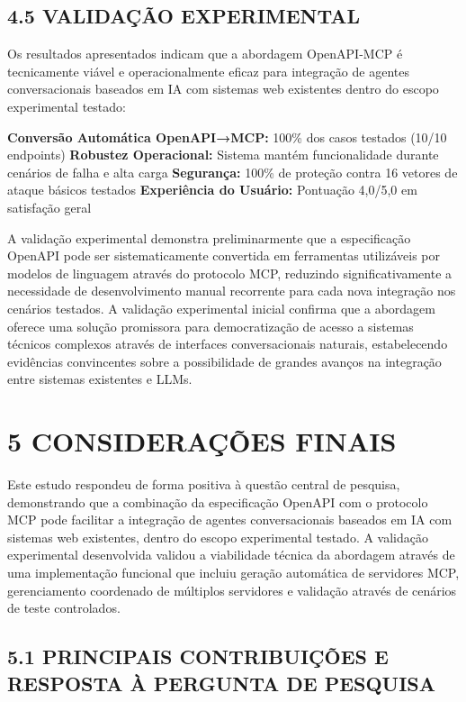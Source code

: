 \documentclass[
]{article}
\begin{document}
\subsection{4.5 VALIDAÇÃO
EXPERIMENTAL}\label{validauxe7uxe3o-experimental}

Os resultados apresentados indicam que a abordagem OpenAPI-MCP é
tecnicamente viável e operacionalmente eficaz para integração de agentes
conversacionais baseados em IA com sistemas web existentes dentro do
escopo experimental testado:

\textbf{Conversão Automática OpenAPI→MCP:} 100\% dos casos testados
(10/10 endpoints) \textbf{Robustez Operacional:} Sistema mantém
funcionalidade durante cenários de falha e alta carga
\textbf{Segurança:} 100\% de proteção contra 16 vetores de ataque
básicos testados \textbf{Experiência do Usuário:} Pontuação 4,0/5,0 em
satisfação geral

A validação experimental demonstra preliminarmente que a especificação
OpenAPI pode ser sistematicamente convertida em ferramentas utilizáveis
por modelos de linguagem através do protocolo MCP, reduzindo
significativamente a necessidade de desenvolvimento manual recorrente
para cada nova integração nos cenários testados. A validação
experimental inicial confirma que a abordagem oferece uma solução
promissora para democratização de acesso a sistemas técnicos complexos
através de interfaces conversacionais naturais, estabelecendo evidências
convincentes sobre a possibilidade de grandes avanços na integração
entre sistemas existentes e LLMs.

\section{5 CONSIDERAÇÕES FINAIS}\label{considerauxe7uxf5es-finais}

Este estudo respondeu de forma positiva à questão central de pesquisa,
demonstrando que a combinação da especificação OpenAPI com o protocolo
MCP pode facilitar a integração de agentes conversacionais baseados em
IA com sistemas web existentes, dentro do escopo experimental testado. A
validação experimental desenvolvida validou a viabilidade técnica da
abordagem através de uma implementação funcional que incluiu geração
automática de servidores MCP, gerenciamento coordenado de múltiplos
servidores e validação através de cenários de teste controlados.

\subsection{5.1 PRINCIPAIS CONTRIBUIÇÕES E RESPOSTA À PERGUNTA DE
PESQUISA}\label{principais-contribuiuxe7uxf5es-e-resposta-uxe0-pergunta-de-pesquisa}
\end{document}
